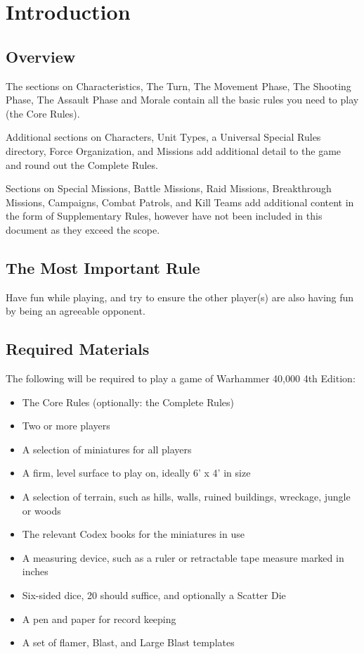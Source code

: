 

\chapter{Introduction}

\section{Overview}

The sections on Characteristics, The Turn, The Movement Phase,
The Shooting Phase, The Assault Phase and Morale contain all the
basic rules you need to play (the Core Rules).

Additional sections on Characters, Unit Types, a Universal Special
Rules directory, Force Organization, and Missions add additional
detail to the game and round out the Complete Rules.

Sections on Special Missions, Battle Missions, Raid Missions,
Breakthrough Missions, Campaigns, Combat Patrols, and Kill
Teams add additional content in the form of Supplementary Rules,
however have not been included in this document as they exceed
the scope.

\section{The Most Important Rule}
Have fun while playing, and try to ensure the other player(s) are
also having fun by being an agreeable opponent.

\section{Required Materials}
The following will be required to play a game of Warhammer
40,000 4th Edition:

\begin{itemize}[label={--}]
	\item The Core Rules (optionally: the Complete Rules)
	\item Two or more players
	\item A selection of miniatures for all players
	\item A firm, level surface to play on, ideally 6’ x 4’ in size
	\item A selection of terrain, such as hills, walls, ruined buildings,
wreckage, jungle or woods
	\item The relevant Codex books for the miniatures in use
	\item A measuring device, such as a ruler or retractable tape measure
marked in inches
	\item Six-sided dice, 20 should suffice, and optionally a Scatter Die
	\item A pen and paper for record keeping
	\item A set of flamer, Blast, and Large Blast templates
\end{itemize}


